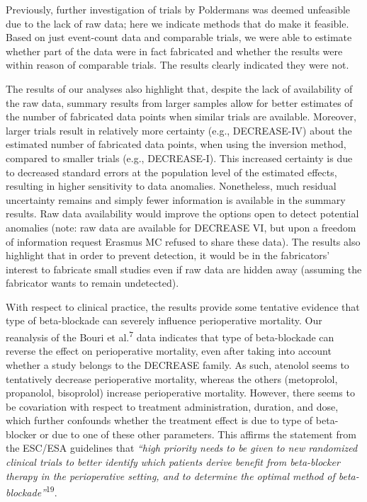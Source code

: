 \documentclass[]{article}
\begin{document}
Previously, further investigation of trials by Poldermans was deemed
unfeasible due to the lack of raw data; here we indicate methods that do
make it feasible. Based on just event-count data and comparable trials,
we were able to estimate whether part of the data were in fact
fabricated and whether the results were within reason of comparable
trials. The results clearly indicated they were not.

The results of our analyses also highlight that, despite the lack of
availability of the raw data, summary results from larger samples allow
for better estimates of the number of fabricated data points when
similar trials are available. Moreover, larger trials result in
relatively more certainty (e.g., DECREASE-IV) about the estimated number
of fabricated data points, when using the inversion method, compared to
smaller trials (e.g., DECREASE-I). This increased certainty is due to
decreased standard errors at the population level of the estimated
effects, resulting in higher sensitivity to data anomalies. Nonetheless,
much residual uncertainty remains and simply fewer information is
available in the summary results. Raw data availability would improve
the options open to detect potential anomalies (note: raw data are
available for DECREASE VI, but upon a freedom of information request
Erasmus MC refused to share these data). The results also highlight that
in order to prevent detection, it would be in the fabricators' interest
to fabricate small studies even if raw data are hidden away (assuming
the fabricator wants to remain undetected).

With respect to clinical practice, the results provide some tentative
evidence that type of beta-blockade can severely influence perioperative
mortality. Our reanalysis of the Bouri et al.\textsuperscript{7} data
indicates that type of beta-blockade can reverse the effect on
perioperative mortality, even after taking into account whether a study
belongs to the DECREASE family. As such, atenolol seems to tentatively
decrease perioperative mortality, whereas the others (metoprolol,
propanolol, bisoprolol) increase perioperative mortality. However, there
seems to be covariation with respect to treatment administration,
duration, and dose, which further confounds whether the treatment effect
is due to type of beta-blocker or due to one of these other parameters.
This affirms the statement from the ESC/ESA guidelines that \emph{``high
priority needs to be given to new randomized clinical trials to better
identify which patients derive benefit from beta-blocker therapy in the
perioperative setting, and to determine the optimal method of
beta-blockade''}\textsuperscript{19}.
\end{document}
